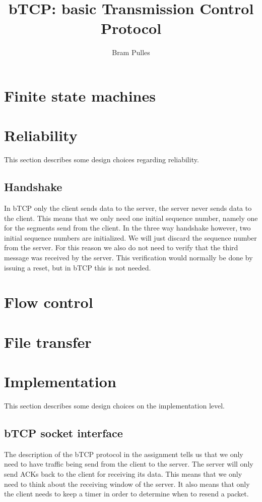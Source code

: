 \documentclass[a4paper]{article}
\author{Bram Pulles}
\title{\textbf{bTCP: basic Transmission Control Protocol}}
\begin{document}
\maketitle

\tableofcontents
\pagebreak

\section{Finite state machines}

\section{Reliability}
This section describes some design choices regarding reliability.

	\subsection{Handshake}
	In bTCP only the client sends data to the server, the server never sends data to the client. This means that we only need one initial sequence number, namely one for the segments send from the client. In the three way handshake however, two initial sequence numbers are initialized. We will just discard the sequence number from the server. For this reason we also do not need to verify that the third message was received by the server. This verification would normally be done by issuing a reset, but in bTCP this is not needed.

\section{Flow control}

\section{File transfer}

\section{Implementation}
This section describes some design choices on the implementation level.

	\subsection{bTCP socket interface}
	The description of the bTCP protocol in the assignment tells us that we only need to have traffic being send from the client to the server. The server will only send ACKs back to the client for receiving its data. This means that we only need to think about the receiving window of the server. It also means that only the client needs to keep a timer in order to determine when to resend a packet.
\end{document}
